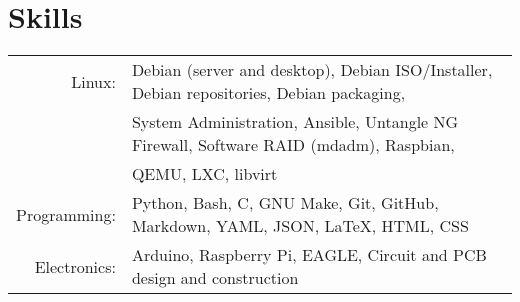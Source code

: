 \documentclass[a4paper,10pt]{article}
\begin{document}
    \section*{Skills}
        \begin{tabular}{rl}
            \large{Linux:} & Debian (server and desktop), Debian ISO/Installer, Debian repositories, Debian packaging,\\
                           & System Administration, Ansible, Untangle NG Firewall, Software RAID (mdadm), Raspbian,\\
                           & QEMU, LXC, libvirt\\
            \large{Programming:} & Python, Bash, C, GNU Make, Git, GitHub, Markdown, YAML, JSON, \LaTeX, HTML, CSS\\
            \large{Electronics:} & Arduino, Raspberry Pi, EAGLE, Circuit and PCB design and construction\\
        \end{tabular}
\end{document}
